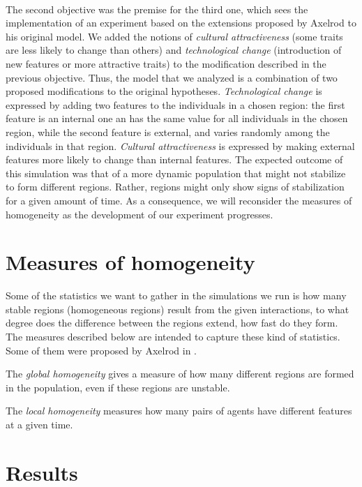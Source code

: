 \documentclass[twoside, 11pt, a4paper]{article}
\begin{document}
\paragraph*{}The second objective was the premise for the third one, which sees the implementation of an experiment based on the extensions proposed by Axelrod to his original model. We added the notions of \emph{cultural attractiveness} (some traits are less likely to change than others) and \emph{technological change} (introduction of new features or more attractive traits) to the modification described in the previous objective. Thus, the model that we analyzed is a combination of two proposed modifications to the original hypotheses. 
\emph{Technological change} is expressed by adding two features to the individuals in a chosen region: the first feature is an internal one an has the same value for all individuals in the chosen region, while the second feature is external, and varies randomly among the individuals in that region.
\emph{Cultural attractiveness} is expressed by making external features more likely to change than internal features. 
The expected outcome of this simulation was that of a more dynamic population that might not stabilize to form different regions. Rather, regions might only show signs of stabilization for a given amount of time. As a consequence, we will reconsider the measures of homogeneity as the development of our experiment progresses.

\section{Measures of homogeneity}

Some of the statistics we want to gather in the simulations we run is how many stable regions (homogeneous regions) result from the given interactions, to what degree does the difference between the regions extend, how fast do they form.
The measures described below are intended to capture these kind of statistics. Some of them were proposed by Axelrod in \cite{Axelrod}.

The \emph{global homogeneity} gives a measure of how many different regions are formed in the population, even if these regions are unstable.

The \emph{local homogeneity} measures how many pairs of agents have different features at a given time.

\section{Results}
\end{document}
